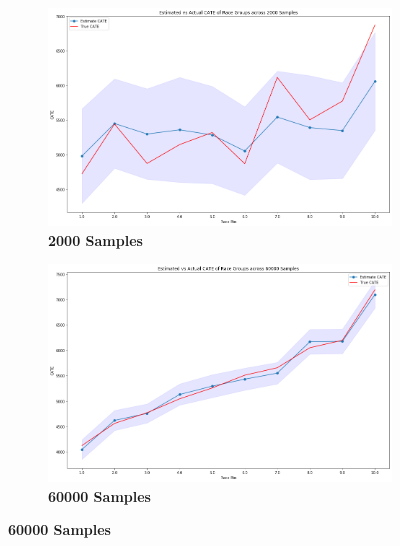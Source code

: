 \documentclass[12pt]{article}
\begin{document}
\begin{figure}[!htp]
\caption{Estimated vs. Actual CATE across Race Groups}
	\centering
	\begin{subfigure} [h] {0.45\linewidth}
		\caption{\textbf{2000 Samples}}
   	 	\includegraphics[width = \linewidth]{Graphs/s2_race2000.png}
	\end{subfigure}
	\begin{subfigure} [h] {0.45\linewidth}
		\caption{\textbf{60000 Samples}}
   	 	\includegraphics[width = \linewidth]{Graphs/s2_race60000.png}
	\end{subfigure}
\end{figure} 
\end{document}
